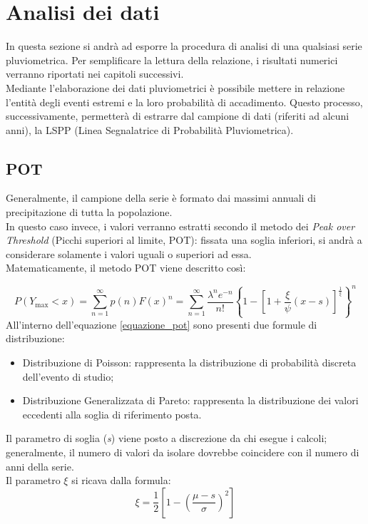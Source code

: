 \section{Analisi dei dati}
In questa sezione si andrà ad esporre la procedura di analisi di una qualsiasi serie pluviometrica. Per semplificare la lettura della relazione, i risultati numerici verranno riportati nei capitoli successivi.\\
Mediante l'elaborazione dei dati pluviometrici è possibile mettere in relazione l'entità degli eventi estremi e la loro probabilità di accadimento. Questo processo, successivamente, permetterà di estrarre dal campione di dati (riferiti ad alcuni anni), la LSPP (Linea Segnalatrice di Probabilità Pluviometrica).\\
\subsection{POT}
Generalmente, il campione della serie è formato dai massimi annuali di precipitazione di tutta la popolazione.\\
In questo caso invece, i valori verranno estratti secondo il metodo dei \textit{Peak over Threshold} (Picchi superiori al limite, POT): fissata una soglia inferiori, si andrà a considerare solamente i valori uguali o superiori ad essa.\\
Matematicamente, il metodo POT viene descritto così:

   \begin{equation} 
  P(Y_{\text{max}} < x) = \sum_{n=1}^{\infty} p(n) F(x)^n = \sum_{n=1}^{\infty} \frac{\lambda^n e^{-n}}{n!} \left\{ 1 - \left[ 1 + \frac{\xi}{\psi} (x - s) \right]^{\frac{1}{\xi}} \right\}^n
\label{equazione_pot}   
\end{equation}
All'interno dell'equazione \ref{equazione_pot} sono presenti due formule di distribuzione:
\begin{itemize}
    \item Distribuzione di Poisson: rappresenta la distribuzione di probabilità discreta dell'evento di studio;
    \item Distribuzione Generalizzata di Pareto: rappresenta la distribuzione dei valori eccedenti alla soglia di riferimento posta.
\end{itemize}

\noindent Il parametro di soglia (\textit{s}) viene posto a discrezione da chi esegue i calcoli; generalmente, il numero di valori da isolare dovrebbe coincidere con il numero di anni della serie.\\
Il parametro $\xi$ si ricava dalla formula:
\begin{equation}
    \xi = \frac{1}{2} \left[1- \left( \frac{\mu - s}{\sigma} \right)^2 \right] 
\end{equation}

